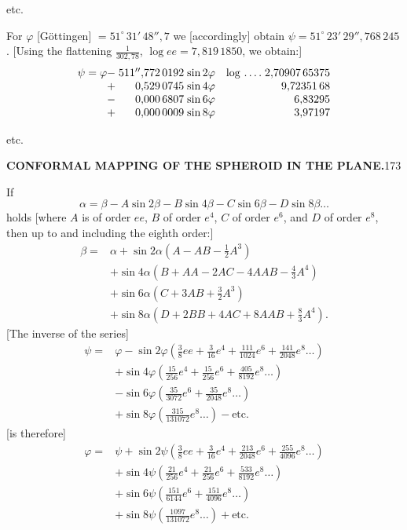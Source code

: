 {\centering etc.\par}
For \(\varphi\) [Göttingen] \(=51^\circ\,31'\,48''{,}7\) we [accordingly] obtain \(\psi=51^\circ\,23'\,29''{,}768\,245\).
[Using the flattening \(\frac1{302{,}78}\), \(\log ee=7{,}819\,1850\), we obtain:]
\[
\begin{array}{@{}r@{\;}r@{\;}l@{\quad}l@{\;}r@{}}
\psi=\varphi-&511''{,}772\,0192&\sin2\varphi&\log\,.\,.\,.\,.&2{,}70907\,65375\\
+&0{,}529\,0745&\sin4\varphi&&9{,}72351\,68\\
-&0{,}000\,6807&\sin6\varphi&&6{,}83295\\
+&0{,}000\,0009&\sin8\varphi&&3{,}97197
\end{array}
\]
{\centering etc.\par}

\par\clearpage
\noindent\null\hfill{\small\textbf{CONFORMAL MAPPING OF THE SPHEROID IN THE PLANE.}}\hfill173\par\medskip
{\centering [22.]\par}
If
\[\alpha=\beta-A\sin2\beta-B\sin4\beta-C\sin6\beta-D\sin8\beta\ldots\]
\noindent holds [where \(A\) is of order \(ee\), \(B\) of order \(e^4\), \(C\) of order \(e^6\), and \(D\) of order \(e^8\), then up to and including the eighth order:]
\[
\begin{aligned}
\beta={}&\alpha+\sin2\alpha(A-AB-\tfrac12A^3)\\
&+\sin4\alpha(B+AA-2AC-4AAB-\tfrac43A^4)\\
&+\sin6\alpha(C+3AB+\tfrac32A^3)\\
&+\sin8\alpha(D+2BB+4AC+8AAB+\tfrac83A^4).
\end{aligned}
\]
[The inverse of the series]
\[
\begin{aligned}
\psi={}&\varphi-\sin2\varphi(\tfrac38ee+\tfrac3{16}e^4+\tfrac{111}{1024}e^6+\tfrac{141}{2048}e^8\ldots)\\
&+\sin4\varphi(\tfrac{15}{256}e^4+\tfrac{15}{256}e^6+\tfrac{405}{8192}e^8\ldots)\\
&-\sin6\varphi(\tfrac{35}{3072}e^6+\tfrac{35}{2048}e^8\ldots)\\
&+\sin8\varphi(\tfrac{315}{131072}e^8\ldots)-\text{etc.}
\end{aligned}
\]
[is therefore]
\[
\begin{aligned}
\varphi={}&\psi+\sin2\psi(\tfrac38ee+\tfrac3{16}e^4+\tfrac{213}{2048}e^6+\tfrac{255}{4096}e^8\ldots)\\
&+\sin4\psi(\tfrac{21}{256}e^4+\tfrac{21}{256}e^6+\tfrac{533}{8192}e^8\ldots)\\
&+\sin6\psi(\tfrac{151}{6144}e^6+\tfrac{151}{4096}e^8\ldots)\\
&+\sin8\psi(\tfrac{1097}{131072}e^8\ldots)+\text{etc.}
\end{aligned}
\]
